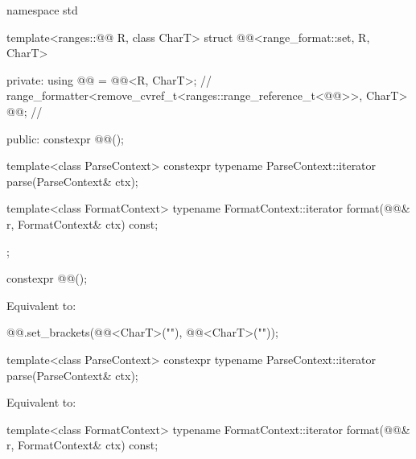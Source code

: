 %
\begin{codeblock}
namespace std {
  template<ranges::@@ R, class CharT>
  struct @@<range_format::set, R, CharT> {
  private:
    using @@ = @@<R, CharT>;                  // \expos
    range_formatter<remove_cvref_t<ranges::range_reference_t<@@>>,
                    CharT> @@;                                 // \expos

  public:
    constexpr @@();

    template<class ParseContext>
      constexpr typename ParseContext::iterator
        parse(ParseContext& ctx);

    template<class FormatContext>
      typename FormatContext::iterator
        format(@@& r, FormatContext& ctx) const;
  };
}
\end{codeblock}

%
\begin{itemdecl}
constexpr @@();
\end{itemdecl}

\begin{itemdescr}
\pnum
\effects
Equivalent to:
\begin{codeblock}
@@.set_brackets(@@<CharT>("{"), @@<CharT>("}"));
\end{codeblock}
\end{itemdescr}

%
\begin{itemdecl}
template<class ParseContext>
  constexpr typename ParseContext::iterator
    parse(ParseContext& ctx);
\end{itemdecl}

\begin{itemdescr}
\pnum
\effects
Equivalent to: 
\end{itemdescr}

%
\begin{itemdecl}
template<class FormatContext>
  typename FormatContext::iterator
    format(@@& r, FormatContext& ctx) const;
\end{itemdecl}

